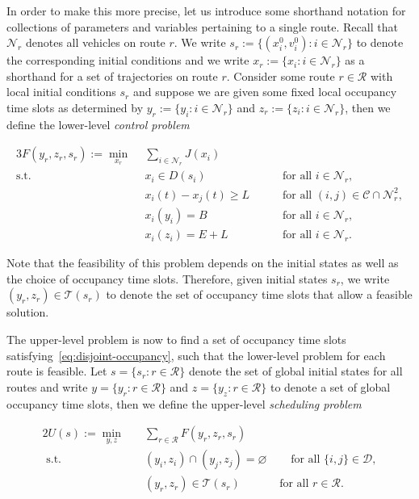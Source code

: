 \documentclass[a4paper]{report}
\theoremstyle{definition}
\theoremstyle{plain}
\begin{document}
In order to make this more precise, let us introduce some shorthand notation for
collections of parameters and variables pertaining to a single route.
%
Recall that $\mathcal{N}_{r}$ denotes all vehicles on route $r$.
We write $s_{r} := \{(x_{i}^{0}, v_{i}^{0}) : i \in \mathcal{N}_{r} \}$ to
denote the corresponding initial conditions and we write
$x_{r} := \{x_{i} : i \in \mathcal{N}_{r} \}$ as a shorthand for a set of
trajectories on route $r$.
%
Consider some route $r \in \mathcal{R}$ with local initial conditions $s_{r}$ and
suppose we are given some fixed local occupancy time slots as determined by
$y_{r} := \{y_{i} : i \in \mathcal{N}_{r}\}$ and
$z_{r} := \{z_{i} : i \in \mathcal{N}_{r}\}$, then we define the lower-level
\emph{control problem}
%
\begin{mdframed}
\vspace{-\abovedisplayskip}
\begin{alignat}{3}\label{eq:lower-level}
  F(y_{r},z_{r}, s_{r}) := \min_{x_{r}} \;\, & \sum_{i \in \mathcal{N}_{r}} J(x_{i}) \tag{L} \\
  \text{s.t. } \; & x_{i} \in D(s_{i})  && \quad \text{ for all } i \in \mathcal{N}_{r} , \tag{L.1} \\
  & x_{i}(t) - x_{j}(t) \geq L && \quad \text{ for all } (i,j) \in \mathcal{C} \cap \mathcal{N}_{r}^2 , \tag{L.2} \\
  & x_{i}(y_i) = B  && \quad \text{ for all } i \in \mathcal{N}_{r} , \tag{L.3} \label{eq:L3} \\
  & x_{i}(z_{i}) = E + L  && \quad \text{ for all } i \in \mathcal{N}_{r} . \tag{L.4} \label{eq:L4}
\end{alignat}
\end{mdframed}
%
Note that the feasibility of this problem depends on the initial states as well
as the choice of occupancy time slots. Therefore, given initial states $s_{r}$,
we write $(y_{r}, z_{r}) \in \mathcal{T}(s_{r})$ to denote the set of occupancy
time slots that allow a feasible solution.

The upper-level problem is now to find a set of occupancy time slots
satisfying~\eqref{eq:disjoint-occupancy}, such that the lower-level problem for each route is feasible.
Let $s = \{s_{r} : r \in \mathcal{R} \}$ denote the set of global initial states for
all routes and write $y = \{y_{r} : r \in \mathcal{R} \}$ and
$z = \{y_{z} : r \in \mathcal{R}\}$ to denote a set of global occupancy time slots,
then we define the upper-level \emph{scheduling problem}
%
\begin{mdframed}
\vspace{-\abovedisplayskip}
\begin{alignat}{2}\label{eq:upper-level}
  U(s) := \min_{y, z} \quad & \sum_{r \in \mathcal{R}} F({y}_{r}, {z}_{r}, s_{r}) \tag{U} \\
  \text{ s.t. } \quad & (y_{i},z_{i}) \cap (y_{j},z_{j}) = \varnothing & \quad \text{ for all } \{i, j\} \in \mathcal{D} , \tag{U.1} \label{eq:U1} \\
                            & ({y}_{r}, {z}_{r}) \in \mathcal{T}(s_{r}) & \text{ for all } r \in \mathcal{R} . \tag{U.2}
\end{alignat}
\end{mdframed}
\end{document}
